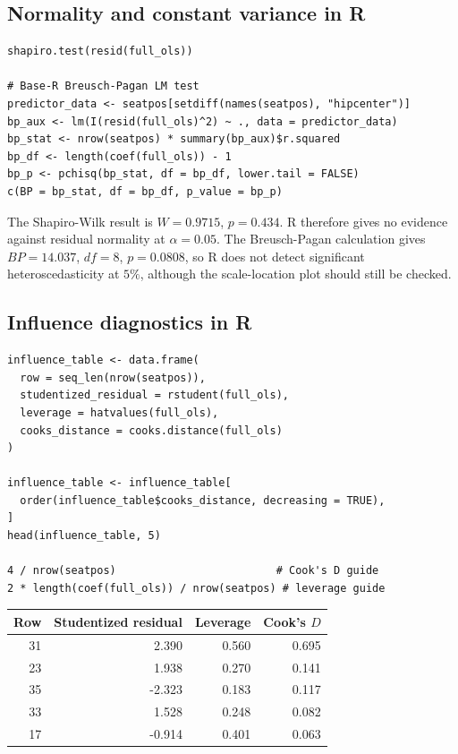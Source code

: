 ﻿\documentclass[11pt]{article}
\begin{document}
\subsection{Normality and constant variance in R}

\begin{lstlisting}
shapiro.test(resid(full_ols))

# Base-R Breusch-Pagan LM test
predictor_data <- seatpos[setdiff(names(seatpos), "hipcenter")]
bp_aux <- lm(I(resid(full_ols)^2) ~ ., data = predictor_data)
bp_stat <- nrow(seatpos) * summary(bp_aux)$r.squared
bp_df <- length(coef(full_ols)) - 1
bp_p <- pchisq(bp_stat, df = bp_df, lower.tail = FALSE)
c(BP = bp_stat, df = bp_df, p_value = bp_p)
\end{lstlisting}

The Shapiro-Wilk result is $W=0.9715$, $p=0.434$. R therefore gives no evidence
against residual normality at $\alpha=0.05$. The Breusch-Pagan calculation gives
$BP=14.037$, $df=8$, $p=0.0808$, so R does not detect significant
heteroscedasticity at $5\%$, although the scale-location plot should still be
checked.

\subsection{Influence diagnostics in R}

\begin{lstlisting}
influence_table <- data.frame(
  row = seq_len(nrow(seatpos)),
  studentized_residual = rstudent(full_ols),
  leverage = hatvalues(full_ols),
  cooks_distance = cooks.distance(full_ols)
)

influence_table <- influence_table[
  order(influence_table$cooks_distance, decreasing = TRUE),
]
head(influence_table, 5)

4 / nrow(seatpos)                         # Cook's D guide
2 * length(coef(full_ols)) / nrow(seatpos) # leverage guide
\end{lstlisting}

\begin{center}
\begin{tabular}{rrrr}
\toprule
\rowcolor{navy!10}\textbf{Row}&\textbf{Studentized residual}&\textbf{Leverage}&\textbf{Cook's $D$}\\
\midrule
31& 2.390&0.560&0.695\\
23& 1.938&0.270&0.141\\
35&-2.323&0.183&0.117\\
33& 1.528&0.248&0.082\\
17&-0.914&0.401&0.063\\
\bottomrule
\end{tabular}
\end{center}
\end{document}
